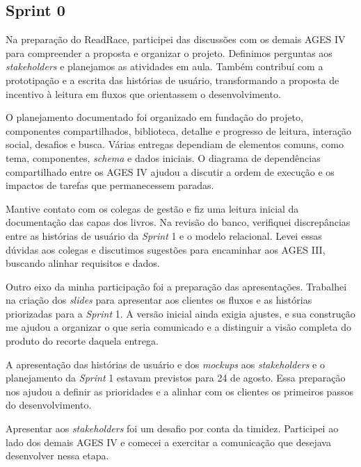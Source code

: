 \subsection{Sprint 0}

Na preparação do ReadRace, participei das discussões com os demais \ac{AGES} IV para compreender a proposta e organizar o projeto. Definimos perguntas aos \textit{stakeholders} e planejamos as atividades em aula. Também contribuí com a prototipação e a escrita das histórias de usuário, transformando a proposta de incentivo à leitura em fluxos que orientassem o desenvolvimento.

O planejamento documentado foi organizado em fundação do projeto, componentes compartilhados, biblioteca, detalhe e progresso de leitura, interação social, desafios e busca. Várias entregas dependiam de elementos comuns, como tema, componentes, \textit{schema} e dados iniciais. O diagrama de dependências compartilhado entre os \ac{AGES} IV ajudou a discutir a ordem de execução e os impactos de tarefas que permanecessem paradas.

Mantive contato com os colegas de gestão e fiz uma leitura inicial da documentação das capas dos livros. Na revisão do banco, verifiquei discrepâncias entre as histórias de usuário da \textit{Sprint} 1 e o modelo relacional. Levei essas dúvidas aos colegas e discutimos sugestões para encaminhar aos \ac{AGES} III, buscando alinhar requisitos e dados.

Outro eixo da minha participação foi a preparação das apresentações. Trabalhei na criação dos \textit{slides} para apresentar aos clientes os fluxos e as histórias priorizadas para a \textit{Sprint} 1. A versão inicial ainda exigia ajustes, e sua construção me ajudou a organizar o que seria comunicado e a distinguir a visão completa do produto do recorte daquela entrega.

A apresentação das histórias de usuário e dos \textit{mockups} aos \textit{stakeholders} e o planejamento da \textit{Sprint} 1 estavam previstos para 24 de agosto. Essa preparação nos ajudou a definir as prioridades e a alinhar com os clientes os primeiros passos do desenvolvimento.

Apresentar aos \textit{stakeholders} foi um desafio por conta da timidez. Participei ao lado dos demais \ac{AGES} IV e comecei a exercitar a comunicação que desejava desenvolver nessa etapa.
